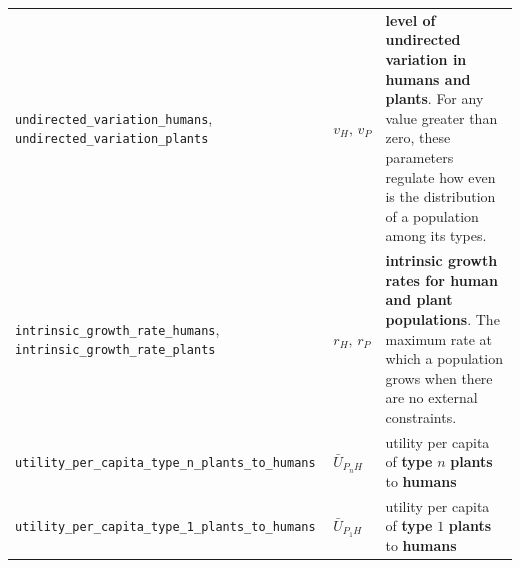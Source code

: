 \documentclass[
]{book}
\begin{document}
\begin{longtable}[]{@{}lll@{}}
\begin{minipage}[t]{0.27\columnwidth}\raggedright
\texttt{undirected\_variation\_humans}, \texttt{undirected\_variation\_plants}\strut
\end{minipage} & \begin{minipage}[t]{0.25\columnwidth}\raggedright
\(v_{H},\,v_{P}\)\strut
\end{minipage} & \begin{minipage}[t]{0.40\columnwidth}\raggedright
\textbf{level of undirected variation in humans and plants}. For any value greater than zero, these parameters regulate how even is the distribution of a population among its types.\strut
\end{minipage}\tabularnewline
\begin{minipage}[t]{0.27\columnwidth}\raggedright
\texttt{intrinsic\_growth\_rate\_humans}, \texttt{intrinsic\_growth\_rate\_plants}\strut
\end{minipage} & \begin{minipage}[t]{0.25\columnwidth}\raggedright
\(r_{H},\,r_{P}\)\strut
\end{minipage} & \begin{minipage}[t]{0.40\columnwidth}\raggedright
\textbf{intrinsic growth rates for human and plant populations}. The maximum rate at which a population grows when there are no external constraints.\strut
\end{minipage}\tabularnewline
\begin{minipage}[t]{0.27\columnwidth}\raggedright
\texttt{utility\_per\_capita\_type\_n\_plants\_to\_humans}\strut
\end{minipage} & \begin{minipage}[t]{0.25\columnwidth}\raggedright
\(\bar{U}_{P_{n}H}\)\strut
\end{minipage} & \begin{minipage}[t]{0.40\columnwidth}\raggedright
utility per capita of \textbf{type} \(n\) \textbf{plants} to \textbf{humans}\strut
\end{minipage}\tabularnewline
\begin{minipage}[t]{0.27\columnwidth}\raggedright
\texttt{utility\_per\_capita\_type\_1\_plants\_to\_humans}\strut
\end{minipage} & \begin{minipage}[t]{0.25\columnwidth}\raggedright
\(\bar{U}_{P_{1}H}\)\strut
\end{minipage} & \begin{minipage}[t]{0.40\columnwidth}\raggedright
utility per capita of \textbf{type} \(1\) \textbf{plants} to \textbf{humans}\strut

\end{minipage}
\end{longtable}
\end{document}
